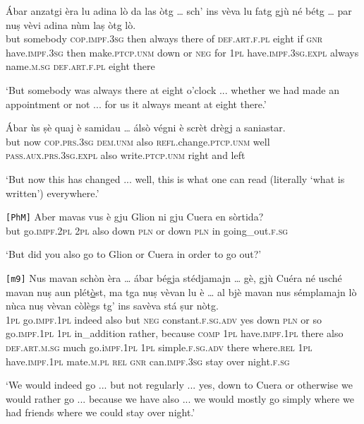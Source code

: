 \begin{linenumbers}
	\gll Ábar anzatgi èra lu adina lò da las òtg … sch’ ins vèva lu fatg gjù né bétg … par nuṣ vèvi adina nùm laṣ òtg lò.   \\
	but somebody \textsc{cop.impf.3sg} then always there of \textsc{def.art.f.pl} eight {} if \textsc{gnr} have.\textsc{impf.3sg} then make.\textsc{ptcp.unm} down or \textsc{neg} {} for \textsc{1pl} have.\textsc{impf.3sg.expl} always name.\textsc{m.sg} \textsc{def.art.f.pl} eight there\\
\end{linenumbers}
\medskip
\glt `But somebody was always there at eight o'clock ... whether we had made an appointment or not ... for us it always meant at eight there.'
\medskip

\begin{linenumbers}
	\gll Ábar ùs ṣè quaj è samidau … álsò végni è scrèt drègj a saniastar.   \\
	but now \textsc{cop.prs.3sg} \textsc{dem.unm} also \textsc{refl}.change.\textsc{ptcp.unm} {} well \textsc{pass.aux.prs.3sg.expl} also write\textsc{.ptcp.unm} right and left\\
\end{linenumbers}
\medskip
\glt `But now this has changed ... well, this is what one can read (literally `what is written') everywhere.'
\medskip

\begin{linenumbers}
	\gll  \texttt{[PhM]} Aber mavas vus è gju Glion ni gju Cuera en sòrtida?  \\
	{} but go.\textsc{impf.2pl} \textsc{2pl} also down \textsc{pln} or down \textsc{pln} in going\_out.\textsc{f.sg}\\
\end{linenumbers}
\medskip
\glt `But did you also go to Glion or Cuera in order to go out?'
\medskip

\begin{linenumbers}
	\gll \texttt{[m9]} Nus mavan schòn èra … ábar bégja stédjamajn … gè, gjù Cuéra né usché mavan nuṣ aun plét\underline{ò}st, ma tga nuṣ vèvan lu è … al bjè mavan nus sémplamajn lò nùca nuṣ vèvan còlègs tg’ ins savèva stá ṣur nòtg.   \\
{} \textsc{1pl} go.\textsc{impf.1pl} indeed also {} but \textsc{neg} constant.\textsc{f.sg.adv} {} yes down \textsc{pln} or so go.\textsc{impf.1pl} \textsc{1pl} in\_addition rather, because \textsc{comp} \textsc{1pl} have.\textsc{impf.1pl} there also {} \textsc{def.art.m.sg} much go.i\textsc{mpf.1pl} \textsc{1pl} simple.\textsc{f.sg.adv} there where.\textsc{rel} \textsc{1pl} have.\textsc{impf.1pl} mate.\textsc{m.pl} \textsc{rel} \textsc{gnr} can.\textsc{impf.3sg} stay over night.\textsc{f.sg}	\\
\end{linenumbers}
\medskip
\glt `We would indeed go ... but not regularly ... yes, down to Cuera or otherwise we would rather go ... because we have also ... we would mostly go simply where we had friends where we could stay over night.'
\medskip

